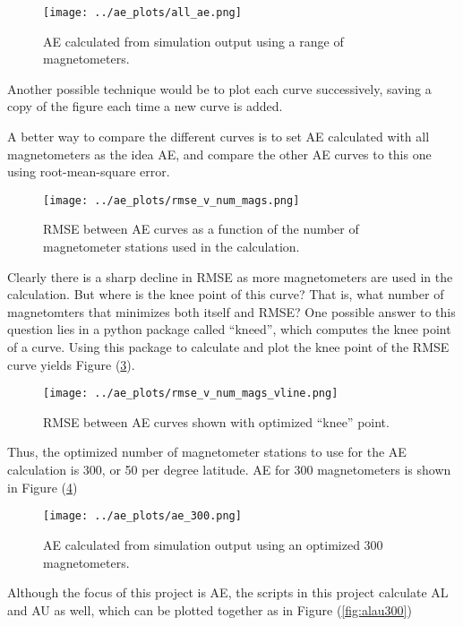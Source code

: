 \documentclass[12pt, letterpaper]{article}
\begin{document}
\begin{figure}[!ht]
  \centering
  \texttt{[image: ../ae\_plots/all\_ae.png]}
  \caption{AE calculated from simulation output using a range of magnetometers.}
  \label{fig:allae}
\end{figure}

Another possible technique would be to plot each curve successively, saving a copy of the figure each time a new curve is added. 

A better way to compare the different curves is to set AE calculated with all magnetometers as the idea AE, and compare the other AE curves to this one using root-mean-square error.

\begin{figure}[!ht]
  \centering
  \texttt{[image: ../ae\_plots/rmse\_v\_num\_mags.png]}
  \caption{RMSE between AE curves as a function of the number of magnetometer stations used in the calculation.}
  \label{fig:rmse}
\end{figure}


Clearly there is a sharp decline in RMSE as more magnetometers are used in the calculation. But where is the knee point of this curve? That is, what number of magnetomters that minimizes both itself and RMSE? One possible answer to this question lies in a python package called ``kneed'', which computes the knee point of a curve. Using this package to calculate and plot the knee point of the RMSE curve yields Figure (\ref{fig:rmseKnee}).

\begin{figure}[!ht]
  \centering
  \texttt{[image: ../ae\_plots/rmse\_v\_num\_mags\_vline.png]}
  \caption{RMSE between AE curves shown with optimized ``knee'' point.}
  \label{fig:rmseKnee}
\end{figure}

Thus, the optimized number of magnetometer stations to use for the AE calculation is 300, or 50 per degree latitude. AE for 300 magnetometers is shown in Figure (\ref{fig:ae300})

\begin{figure}[!ht]
  \centering
  \texttt{[image: ../ae\_plots/ae\_300.png]}
  \caption{AE calculated from simulation output using an optimized 300 magnetometers.}
  \label{fig:ae300}
\end{figure}

Although the focus of this project is AE, the scripts in this project calculate AL and AU as well, which can be plotted together as in Figure (\ref{fig:alau300})
\end{document}
